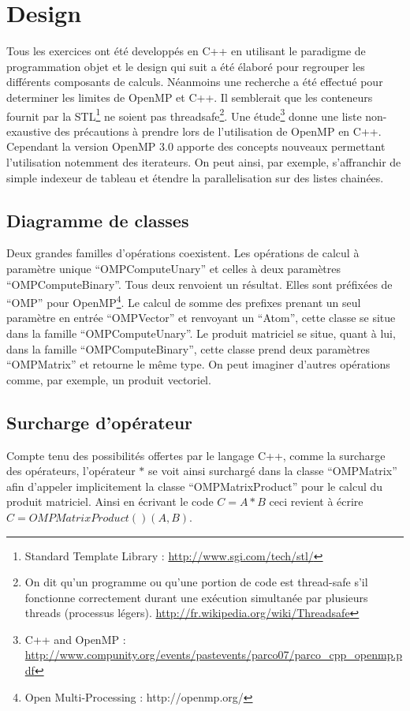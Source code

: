 \section{Design}

Tous les exercices ont été developpés en C++ en utilisant le paradigme de programmation objet et le design qui suit a été élaboré pour regrouper les différents composants de calculs. Néanmoins une recherche a été effectué pour determiner les limites de OpenMP et C++. Il semblerait que les conteneurs fournit par la STL\footnote{Standard Template Library : \url{http://www.sgi.com/tech/stl/}} ne soient pas threadsafe\footnote{On dit qu’un programme ou qu'une portion de code est thread-safe s'il fonctionne correctement durant une exécution simultanée par plusieurs threads (processus légers). \url{http://fr.wikipedia.org/wiki/Threadsafe}}. Une étude\footnote{C++ and OpenMP : \url{http://www.compunity.org/events/pastevents/parco07/parco_cpp_openmp.pdf}} donne une liste non-exaustive des précautions à prendre lors de l’utilisation de OpenMP en C++. Cependant la version OpenMP 3.0 apporte des concepts nouveaux permettant l’utilisation notemment des iterateurs. On peut ainsi, par exemple, s’affranchir de simple indexeur de tableau et étendre la parallelisation sur des listes chainées.

\subsection{Diagramme de classes}

Deux grandes familles d'opérations coexistent. Les opérations de calcul à paramètre unique ``OMPComputeUnary'' et celles à deux paramètres ``OMPComputeBinary''. Tous deux renvoient un résultat. Elles sont préfixées de ``OMP'' pour OpenMP\footnote{Open Multi-Processing : http://openmp.org/}. Le calcul de somme des prefixes prenant un seul paramètre en entrée ``OMPVector'' et renvoyant un ``Atom'', cette classe se situe dans la famille ``OMPComputeUnary''. Le produit matriciel se situe, quant à lui, dans la famille “OMPComputeBinary”, cette classe prend deux paramètres ``OMPMatrix'' et retourne le même type. On peut imaginer d'autres opérations comme, par exemple, un produit vectoriel.

\subsection{Surcharge d'opérateur}

Compte tenu des possibilités offertes par le langage C++, comme la surcharge des opérateurs, l'opérateur $*$ se voit ainsi surchargé dans la classe ``OMPMatrix'' afin d'appeler implicitement la classe ``OMPMatrixProduct'' pour le calcul du produit matriciel. Ainsi en écrivant le code $C = A * B$ ceci revient à écrire $C = OMPMatrixProduct()(A, B)$.
